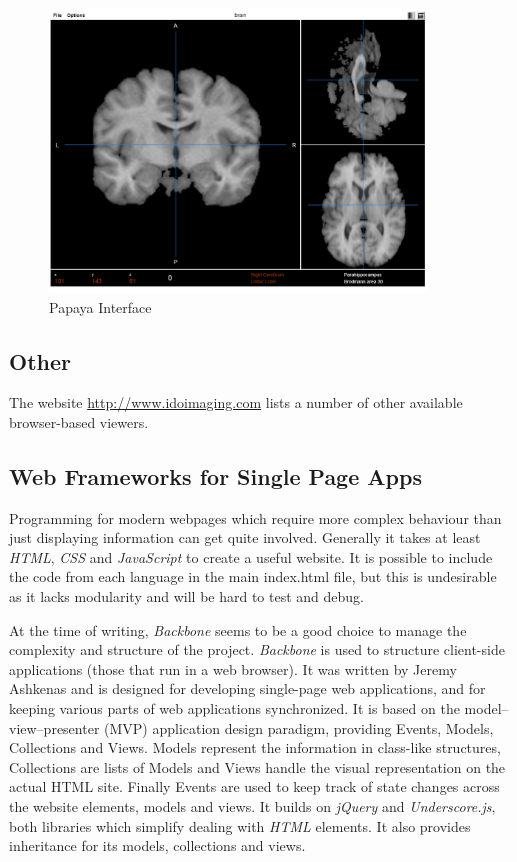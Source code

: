 \documentclass[a4paper,11pt,titlepage]{article}
\begin{document}
\begin{figure}[ht!]
\centering
\includegraphics[width=100mm]{graphics/webViewer_02.png}
\caption{Papaya Interface}
\label{fig:UIdesign1}
\end{figure}

\subsection{Other}

The website \url{http://www.idoimaging.com} lists a number of other available browser-based viewers.


\subsection{Web Frameworks for Single Page Apps}

Programming for modern webpages which require more complex behaviour than just displaying information can get quite involved. Generally it takes at least \textit{HTML}, \textit{CSS} and \textit{JavaScript} to create a useful website. It is possible to include the code from each language in the main index.html file, but this is undesirable as it lacks modularity and will be hard to test and debug.

At the time of writing, \textit{Backbone} seems to be a good choice to manage the complexity and structure of the project. \textit{Backbone} is used to structure client-side applications (those that run in a web browser). It was written by Jeremy Ashkenas and is designed for developing single-page web applications, and for keeping various parts of web applications synchronized. It is based on the model–view–presenter (MVP) application design paradigm, providing Events, Models, Collections and Views. Models represent the information in class-like structures, Collections are lists of Models and Views handle the visual representation on the actual HTML site. Finally Events are used to keep track of state changes across the website elements, models and views. It builds on \textit{jQuery} and \textit{Underscore.js}, both libraries which simplify dealing with \textit{HTML} elements. It also provides inheritance for its models, collections and views.
\end{document}
